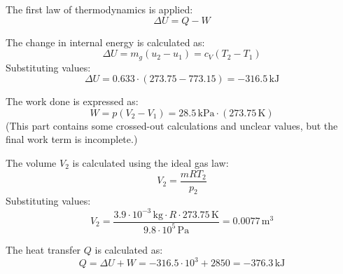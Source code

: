 The first law of thermodynamics is applied:  
\[
\Delta U = Q - W
\]  

The change in internal energy is calculated as:  
\[
\Delta U = m_g (u_2 - u_1) = c_V (T_2 - T_1)
\]  
Substituting values:  
\[
\Delta U = 0.633 \cdot (273.75 - 773.15) = -316.5 \, \text{kJ}
\]  

The work done is expressed as:  
\[
W = p (V_{2} - V_{1}) = 28.5 \, \text{kPa} \cdot (273.75 \, \text{K})
\]  
(This part contains some crossed-out calculations and unclear values, but the final work term is incomplete.)  

The volume \( V_2 \) is calculated using the ideal gas law:  
\[
V_2 = \frac{m R T_2}{p_2}
\]  
Substituting values:  
\[
V_2 = \frac{3.9 \cdot 10^{-3} \, \text{kg} \cdot R \cdot 273.75 \, \text{K}}{9.8 \cdot 10^5 \, \text{Pa}} = 0.0077 \, \text{m}^3
\]  

The heat transfer \( Q \) is calculated as:  
\[
Q = \Delta U + W = -316.5 \cdot 10^3 + 2850 = -376.3 \, \text{kJ}
\]